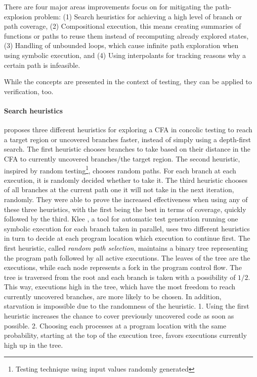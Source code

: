 There are four major areas improvements focus on for mitigating the path-explosion problem:
(1) Search heuristics for achieving a high level of branch or path coverage,
(2) Compositional execution, this means creating summaries of functions or paths to reuse them instead of recomputing already explored states,
(3) Handling of unbounded loops, which cause infinite path exploration when using symbolic execution, and
(4) Using interpolants for tracking reasons why a certain path is infeasible.


While the concepts are presented in the context of testing, they can be applied to verification, too.

\paragraph*{Search heuristics}
\cite{Burnim2008} proposes three different heuristics for exploring a CFA in concolic testing to reach a target region or uncovered branches faster, instead of simply using a depth-first search.
The first heuristic chooses branches to take based on their distance in the CFA to currently uncovered branches/the target region.
The second heuristic, inspired by random testing\footnote{Testing technique using input values randomly generated}, chooses random paths.
For each branch at each execution, it is randomly decided whether to take it.
The third heuristic chooses of all branches at the current path one it will not take in the next iteration, randomly.
They were able to prove the increased effectiveness when using any of these three heuristics, with the first being the best in terms of coverage, quickly followed by the third.
Klee \cite{Cadar2008}, a tool for automatic test generation running one symbolic execution for each branch taken in parallel, uses two different heuristics in turn to decide at each program location which execution to continue first.
The first heuristic, called \emph{random path selection}, maintains a binary tree representing the program path followed by all active executions.
The leaves of the tree are the executions, while each node represents a fork in the program control flow.
The tree is traversed from the root and each branch is taken with a possibility of $1/2$.
This way, executions high in the tree, which have the most freedom to reach currently uncovered branches, are more likely to be chosen.
In addition, starvation is impossible due to the randomness of the heuristic.
1. Using the first heuristic increases the chance to cover previously uncovered code as soon as possible.
2. Choosing each processes at a program location with the same probability, starting at the top of the execution tree, favors executions currently high up in the tree.

